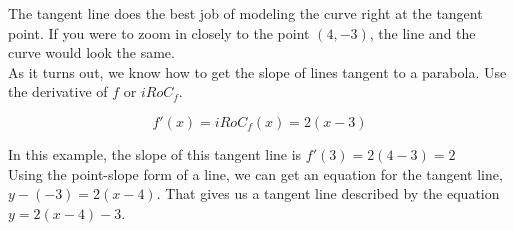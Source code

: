 \documentclass{ximera}
\begin{document}
\begin{image}
\end{image}



The tangent line does the best job of modeling the curve right at the tangent point. If you were to zoom in closely to the point $(4, -3)$, the line and the curve would look the same.\\


As it turns out, we know how to get the slope of lines tangent to a parabola.  Use the derivative of $f$ or $iRoC_f$.   

\[ 
f'(x)=iRoC_f(x) = 2 (x - 3)
\] 

In this example, the slope of this tangent line is $f'(3) = 2 (4-3) = 2$ \\

Using the point-slope form of a line, we can get an equation for the tangent line, $y - (-3)=2 (x-4)$. That gives us a tangent line described by the equation $y = 2 (x - 4) - 3$.
\end{document}
